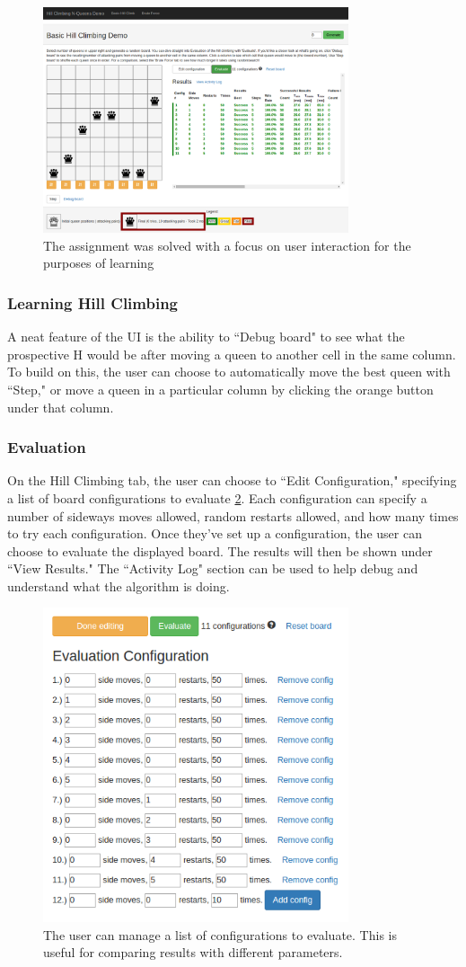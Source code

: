 \begin{figure}[ht!]
\centering
\includegraphics[width=90mm]{img/ui.png}
\caption{The assignment was solved with a focus on user interaction for the purposes of learning}
\label{fig:ui}
\end{figure}

\subsubsection{Learning Hill Climbing}
A neat feature of the UI is the ability to ``Debug board" to see what the prospective H would be after moving a queen to
another cell in the same column. To build on this, the user can choose to automatically move the best queen with ``Step,"
or move a queen in a particular column by clicking the orange button under that column.

\subsubsection{Evaluation}
On the Hill Climbing tab, the user can choose to ``Edit Configuration," specifying a list of board configurations to
evaluate \ref{fig:config}. Each configuration can specify a number of sideways moves allowed, random restarts allowed, and how many
times to try each configuration. Once they've set up a configuration, the user can choose to evaluate the displayed
board. The results will then be shown under ``View Results." The ``Activity Log" section can be used to help debug and
understand what the algorithm is doing.


\begin{figure}[ht!]
\centering
\includegraphics[width=90mm]{img/config.png}
\caption{The user can manage a list of configurations to evaluate. This is useful for comparing results with different parameters.}
\label{fig:config}
\end{figure}
